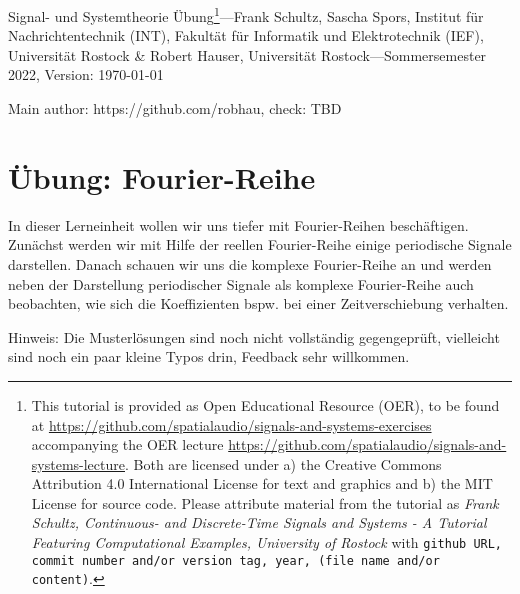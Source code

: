 \documentclass[11pt,a4paper,DIV=12]{scrartcl}
\begin{document}
%
\noindent Signal- und Systemtheorie Übung\footnote{This tutorial is provided as
Open Educational Resource (OER), to be found at
\url{https://github.com/spatialaudio/signals-and-systems-exercises}
accompanying the OER lecture
\url{https://github.com/spatialaudio/signals-and-systems-lecture}.
%
Both are licensed under a) the Creative Commons Attribution 4.0 International
License for text and graphics and b) the MIT License for source code.
%
Please attribute material from the tutorial as \textit{Frank Schultz,
Continuous- and Discrete-Time Signals and Systems - A Tutorial Featuring
Computational Examples, University of Rostock} with
\texttt{github URL, commit number and/or version tag, year, (file name and/or
content)}.}---Frank Schultz, Sascha Spors,
Institut für Nachrichtentechnik (INT),
Fakultät für Informatik und Elektrotechnik (IEF),
Universität Rostock \&
Robert Hauser, Universität Rostock---Sommersemester 2022, Version: \today
%

\noindent Main author: https://github.com/robhau, check: TBD

\tableofcontents

\section{Übung: Fourier-Reihe}
In dieser Lerneinheit wollen wir uns tiefer mit Fourier-Reihen beschäftigen.
Zunächst werden wir mit Hilfe der reellen Fourier-Reihe einige periodische Signale
darstellen.
%
Danach schauen wir uns die komplexe Fourier-Reihe an und werden neben der
Darstellung periodischer Signale als komplexe Fourier-Reihe auch beobachten,
wie sich die Koeffizienten bspw. bei einer Zeitverschiebung verhalten.

Hinweis: Die Musterlösungen sind noch nicht vollständig gegengeprüft, vielleicht
sind noch ein paar kleine Typos drin, Feedback sehr willkommen.
\end{document}
